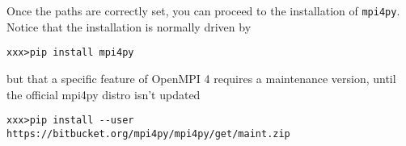 Once the paths are correctly set, you can proceed to the installation of
\texttt{mpi4py}.
Notice that the installation is normally driven by
\begin{verbatim}
xxx>pip install mpi4py
\end{verbatim}
but that a specific feature of OpenMPI 4 requires a maintenance
version, until the official mpi4py distro isn't updated
\begin{verbatim}
xxx>pip install --user https://bitbucket.org/mpi4py/mpi4py/get/maint.zip
\end{verbatim}

